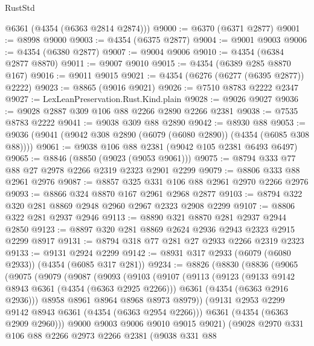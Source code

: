 \begin{lexlean}{RustStd}
\begin{coremodule}
      @6361
      (@4354 (@6363 @2814 @2874)))
@9000 := @6370 (@6371 @2877)
@9001 := @8998 @9000
@9003 := @4354 (@6375 @2877)
@9004 := @9001 @9003
@9006 := @4354 (@6380 @2877)
@9007 := @9004 @9006
@9010 := @4354 (@6384 @2877 @8870)
@9011 := @9007 @9010
@9015 := @4354 (@6389 @285 @8870 @167)
@9016 := @9011 @9015
@9021 := @4354 (@6276 (@6277 (@6395 @2877)) @2222)
@9023 := @8865 (@9016 @9021)
@9026 := @7510 @8783 @2222 @2347
@9027 := LexLeanPreservation.Rust.Kind.plain
@9028 := @9026 @9027
@9036 := @9028 @2887 @309 @106 @88 @2266 @2890 @2266 @2381
@9038 := @7535 @8783 @2222
@9041 := @9038 @309 @88 @2890
@9042 := @8930 @88
@9053 := @9036 (@9041 (@9042 @308 @2890 (@6079 (@6080 @2890)) (@4354 (@6085 @308 @88))))
@9061 := @9038 @106 @88 @2381 (@9042 @105 @2381 @6493 @6497)
@9065 := @8846 (@8850 (@9023 (@9053 @9061)))
@9075 := @8794 @333 @77 @88 @27 @2978 @2266 @2319 @2323 @2901 @2299
@9079 := @8806 @333 @88 @2961 @2976
@9087 := @8857 @325 @331 @106 @88 @2961 @2970 @2266 @2976
@9093 := @8866 @324 @8870 @167 @2961 @2968 @2877
@9103 := @8794 @322 @320 @281 @8869 @2948 @2960 @2967 @2323 @2908 @2299
@9107 := @8806 @322 @281 @2937 @2946
@9113 := @8890 @321 @8870 @281 @2937 @2944 @2850
@9123 := @8897 @320 @281 @8869 @2624 @2936 @2943 @2323 @2915 @2299 @8917
@9131 := @8794 @318 @77 @281 @27 @2933 @2266 @2319 @2323
@9133 := @9131 @2924 @2299
@9142 := @8931 @317 @2933 (@6079 (@6080 @2933)) (@4354 (@6085 @317 @281))
@9234 := @8826
    (@8830
      (@8836
        (@9065
          (@9075
            (@9079
              (@9087
                (@9093
                  (@9103
                    (@9107
                      (@9113
                        (@9123
                          (@9133 @9142 @8943 @6361 (@4354 (@6363 @2925 @2266)))
                          @6361
                          (@4354 (@6363 @2916 @2936)))
                        @8958
                        @8961
                        @8964
                        @8968
                        @8973
                        @8979))
                    (@9131 @2953 @2299 @9142 @8943 @6361 (@4354 (@6363 @2954 @2266)))
                    @6361
                    (@4354 (@6363 @2909 @2960)))
                  @9000
                  @9003
                  @9006
                  @9010
                  @9015
                  @9021)
                (@9028
                  @2970
                  @331
                  @106
                  @88
                  @2266
                  @2973
                  @2266
                  @2381
                  (@9038
                    @331
                    @88

\end{coremodule}
\end{lexlean}
